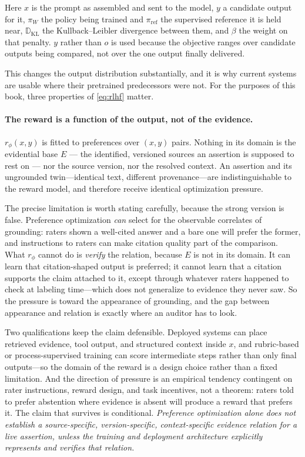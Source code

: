 Here $x$ is the prompt as assembled and sent to the model, $y$ a candidate output
for it, $\pi_W$ the policy being trained and $\pi_{\mathrm{ref}}$ the supervised
reference it is held near, $\mathbb{D}_{\mathrm{KL}}$ the Kullback--Leibler
divergence between them, and $\beta$ the weight on that penalty. $y$ rather than $o$
is used because the objective ranges over candidate outputs being compared, not over
the one output finally delivered.

This changes the output distribution substantially, and it is why current systems
are usable where their pretrained predecessors were not. For the purposes of this
book, three properties of \eqref{eq:rlhf} matter.

\paragraph{The reward is a function of the output, not of the evidence.}
$r_\phi(x, y)$ is fitted to preferences over $(x, y)$ pairs. Nothing in its domain
is the evidential base $E$ --- the identified, versioned sources an assertion is
supposed to rest on --- nor the source version, nor the resolved context. An assertion
and its ungrounded twin---identical text, different provenance---are
indistinguishable to the reward model, and therefore receive identical
optimization pressure.

The precise limitation is worth stating carefully, because the strong version is
false. Preference optimization \emph{can} select for the observable correlates of
grounding: raters shown a well-cited answer and a bare one will prefer the former,
and instructions to raters can make citation quality part of the comparison. What
$r_\phi$ cannot do is \emph{verify} the relation, because $E$ is not in its domain.
It can learn that citation-shaped output is preferred; it cannot learn that a
citation supports the claim attached to it, except through whatever raters happened
to check at labeling time---which does not generalize to evidence they never saw.
So the pressure is toward the appearance of grounding, and the gap between appearance
and relation is exactly where an auditor has to look.

Two qualifications keep the claim defensible. Deployed systems can place retrieved
evidence, tool output, and structured context inside $x$, and rubric-based or
process-supervised training can score intermediate steps rather than only final
outputs---so the domain of the reward is a design choice rather than a fixed limitation.
And the direction of pressure is an empirical tendency contingent on rater instructions,
reward design, and task incentives, not a theorem: raters told to prefer abstention
where evidence is absent will produce a reward that prefers it. The claim that survives
is conditional. \emph{Preference optimization alone does not establish a
source-specific, version-specific, context-specific evidence relation for a live
assertion, unless the training and deployment architecture explicitly represents and
verifies that relation.}

